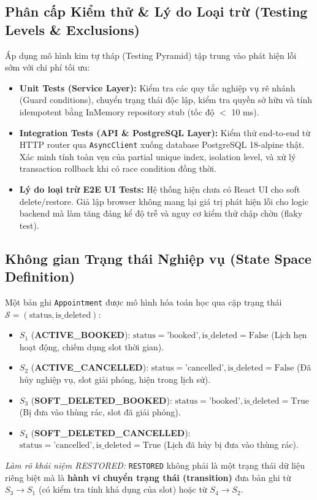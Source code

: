 \documentclass[10pt,a4paper]{article}
\begin{document}
\subsection{Phân cấp Kiểm thử \& Lý do Loại trừ (Testing Levels \& Exclusions)}
Áp dụng mô hình kim tự tháp (Testing Pyramid) tập trung vào phát hiện lỗi sớm với chi phí tối ưu:
\begin{itemize}[leftmargin=1.1em,itemsep=0.2pt]
  \item \textbf{Unit Tests (Service Layer):} Kiểm tra các quy tắc nghiệp vụ rẽ nhánh (Guard conditions), chuyển trạng thái độc lập, kiểm tra quyền sở hữu và tính idempotent bằng InMemory repository stub (tốc độ $<$ 10 ms).
  \item \textbf{Integration Tests (API \& PostgreSQL Layer):} Kiểm thử end-to-end từ HTTP router qua \texttt{AsyncClient} xuống database PostgreSQL 18-alpine thật. Xác minh tính toàn vẹn của partial unique index, isolation level, và xử lý transaction rollback khi có race condition đồng thời.
  \item \textbf{Lý do loại trừ E2E UI Tests:} Hệ thống hiện chưa có React UI cho soft delete/restore. Giả lập browser không mang lại giá trị phát hiện lỗi cho logic backend mà làm tăng đáng kể độ trễ và nguy cơ kiểm thử chập chờn (flaky test).
\end{itemize}

\subsection{Không gian Trạng thái Nghiệp vụ (State Space Definition)}
Một bản ghi \texttt{Appointment} được mô hình hóa toán học qua cặp trạng thái $\mathcal{S} = (\text{status}, \text{is\_deleted})$:
\begin{itemize}[leftmargin=1.1em,itemsep=0.1pt]
  \item $S_1$ (\textbf{ACTIVE\_BOOKED}): $\text{status}=\text{'booked'}, \text{is\_deleted}=\text{False}$ (Lịch hẹn hoạt động, chiếm dụng slot thời gian).
  \item $S_2$ (\textbf{ACTIVE\_CANCELLED}): $\text{status}=\text{'cancelled'}, \text{is\_deleted}=\text{False}$ (Đã hủy nghiệp vụ, slot giải phóng, hiện trong lịch sử).
  \item $S_3$ (\textbf{SOFT\_DELETED\_BOOKED}): $\text{status}=\text{'booked'}, \text{is\_deleted}=\text{True}$ (Bị đưa vào thùng rác, slot đã giải phóng).
  \item $S_4$ (\textbf{SOFT\_DELETED\_CANCELLED}): $\text{status}=\text{'cancelled'}, \text{is\_deleted}=\text{True}$ (Lịch đã hủy bị đưa vào thùng rác).
\end{itemize}
\textit{Làm rõ khái niệm RESTORED:} \texttt{RESTORED} không phải là một trạng thái dữ liệu riêng biệt mà là \textbf{hành vi chuyển trạng thái (transition)} đưa bản ghi từ $S_3 \rightarrow S_1$ (có kiểm tra tính khả dụng của slot) hoặc từ $S_4 \rightarrow S_2$.
\end{document}
